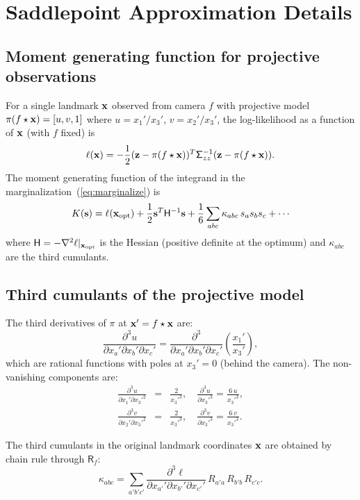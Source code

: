 \documentclass[journal]{IEEEtran}
\newcommand{\sfSigma}[1]{\mathsf{\Sigma}_\mathnormal{#1}}
\newcommand{\beq}{\begin{equation}}
\newcommand{\eeq}{\end{equation}}
\newcommand{\beqar}{\begin{eqnarray}}
\newcommand{\eeqar}{\end{eqnarray}}
\begin{document}
\section{Saddlepoint Approximation Details}
\label{app:saddlepoint}

\subsection{Moment generating function for projective observations}

For a single landmark ${\bf x}$ observed from camera $f$ with projective 
model $\pi(f\star{\bf x}) = [u, v, 1]$ where $u = x_1'/x_3'$, $v = x_2'/x_3'$, 
the log-likelihood as a function of ${\bf x}$ (with $f$ fixed) is
\beq
    \ell({\bf x}) = -\frac{1}{2}({\bf z} - \pi(f\star{\bf x}))^T \sfSigma{zz}^{-1} 
    ({\bf z} - \pi(f\star{\bf x})).
\eeq
The moment generating function of the integrand in the marginalization~(\ref{eq:marginalize}) is
\beq
    K({\bf s}) = \ell({\bf x}_{\rm opt}) + \frac{1}{2}{\bf s}^T \mathsf{H}^{-1} {\bf s}
    + \frac{1}{6}\sum_{abc} \kappa_{abc}\, s_a s_b s_c + \cdots
    \label{eq:cumulantexpansion}
\eeq
where $\mathsf{H} = -\nabla^2 \ell |_{{\bf x}_{\rm opt}}$ is the Hessian 
(positive definite at the optimum) and $\kappa_{abc}$ are the third cumulants.

\subsection{Third cumulants of the projective model}

The third derivatives of $\pi$ at ${\bf x}' = f\star{\bf x}$ are:
\beq
    \frac{\partial^3 u}{\partial x_a' \partial x_b' \partial x_c'} = 
    \frac{\partial^3}{\partial x_a' \partial x_b' \partial x_c'}\left(\frac{x_1'}{x_3'}\right),
\eeq
which are rational functions with poles at $x_3' = 0$ (behind the camera).
The non-vanishing components are:
\beqar
    \frac{\partial^3 u}{\partial x_1' \partial x_3'^2} &=& \frac{2}{x_3'^3}, \quad
    \frac{\partial^3 u}{\partial x_3'^3} = \frac{6\, u}{x_3'^3}, \nonumber \\
    \frac{\partial^3 v}{\partial x_2' \partial x_3'^2} &=& \frac{2}{x_3'^3}, \quad
    \frac{\partial^3 v}{\partial x_3'^3} = \frac{6\, v}{x_3'^3}.
    \label{eq:thirdderivs}
\eeqar

The third cumulants in the original landmark coordinates ${\bf x}$ 
are obtained by chain rule through $\mathsf{R}_f$:
\beq
    \kappa_{abc} = \sum_{a'b'c'} \frac{\partial^3 \ell}{\partial x_{a'}' \partial x_{b'}' \partial x_{c'}'}
    \, R_{a'a}\, R_{b'b}\, R_{c'c}.
    \label{eq:thirdcumulants}
\eeq
\end{document}

